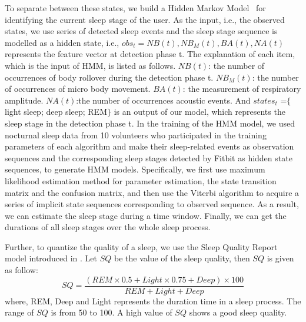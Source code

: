 To separate between these states, we build a Hidden Markov Model~\cite{johnson2010hidden} for identifying the current sleep stage of the user. As the input, i.e., the observed states, we use series of detected sleep events and the sleep stage sequence is modelled as a hidden state, i.e., $obs_t={NB(t),NB_M(t),BA(t),NA(t)}$ represents the feature vector at detection phase t. The explanation of each item, which is the input of HMM, is listed as follows. $NB(t)$: the number of occurrences of body rollover during the detection phase t. $NB_M(t)$: the number of occurrences of micro body movement. $BA(t)$: the measurement of  respiratory amplitude. $NA(t)$:the number of occurrences acoustic events. And $states_t$ =$\{$light sleep; deep sleep; REM$\}$ is an output of our model, which represents the sleep stage in the detection phase t. In the training of the HMM model, we used nocturnal sleep data from 10 volunteers who participated in the training parameters of each algorithm and make their sleep-related events as observation sequences and the corresponding sleep stages detected by Fitbit as hidden state sequences, to generate HMM models. Specifically, we first use maximum likelihood estimation method for parameter estimation, the state transition matrix and the confusion matrix, and then use the Viterbi algorithm to acquire a series of implicit state sequences corresponding to observed sequence.  As a result, we can estimate the sleep stage during a time window. Finally, we can get the durations of all sleep stages over the whole sleep process.

Further, to quantize the quality of a sleep, we use the Sleep Quality Report model introduced in \cite{gu2016sleep}. Let $SQ$ be the value of the sleep quality, then $SQ$ is given as follow:
 \begin{equation}
SQ=\frac{(REM \times 0.5+Light \times 0.75+Deep) \times 100}{REM+Light+Deep}
 \end{equation}
where, REM, Deep and Light represents the duration time in a sleep process. The range of $SQ$ is from 50 to 100. A high value of $SQ$ shows a good  sleep quality.

